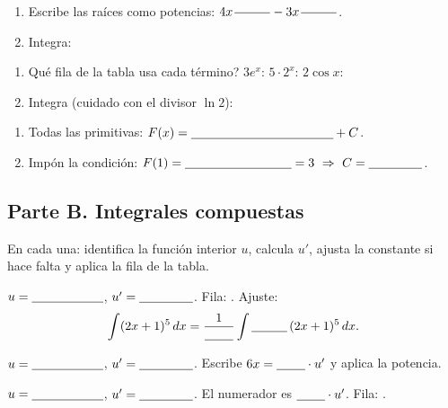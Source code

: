 \documentclass[11pt]{article}
\begin{document}
\begin{enumerate}[label=\alph*)]
  \item Escribe las raíces como potencias: \(4x^{\,\hueco[1cm]}-3x^{\,\hueco[1cm]}\).
  \item Integra: \hueco[8cm]
\end{enumerate}
\resultado\comprueba

\begin{enumerate}[label=\alph*)]
  \item \textquestiondown{}Qué fila de la tabla usa cada término? \(3e^x\): \hueco[2.5cm] \quad \(5\cdot2^x\): \hueco[2.5cm] \quad \(2\cos x\): \hueco[2.5cm]
  \item Integra (cuidado con el divisor \(\ln2\)): \hueco[8cm]
\end{enumerate}
\resultado

\begin{enumerate}[label=\alph*)]
  \item Todas las primitivas: \(F(x)=\hueco[4cm]+C\).
  \item Impón la condición: \(F(1)=\hueco[3cm]=3\ \Rightarrow\ C=\hueco[1.5cm]\).
\end{enumerate}
\resultado

\subsection*{Parte B. Integrales compuestas}
\setcounter{ejercicio}{0}
En cada una: identifica la función interior \(u\), calcula \(u'\), ajusta la constante si hace falta y aplica la fila de la tabla.

\(u=\hueco[2cm]\), \(u'=\hueco[1.5cm]\). Fila: \hueco[3cm]. Ajuste:
\[\int(2x+1)^5\dd=\frac{1}{\hueco[0.8cm]}\int\hueco[1cm]\,(2x+1)^5\dd.\]
\resultado\comprueba

\(u=\hueco[2cm]\), \(u'=\hueco[1.5cm]\). Escribe \(6x=\hueco[0.8cm]\cdot u'\) y aplica la potencia.
\resultado\comprueba

\(u=\hueco[2cm]\), \(u'=\hueco[1.5cm]\). El numerador es \(\hueco[0.8cm]\cdot u'\). Fila: \hueco[3cm].
\resultado
\end{document}
